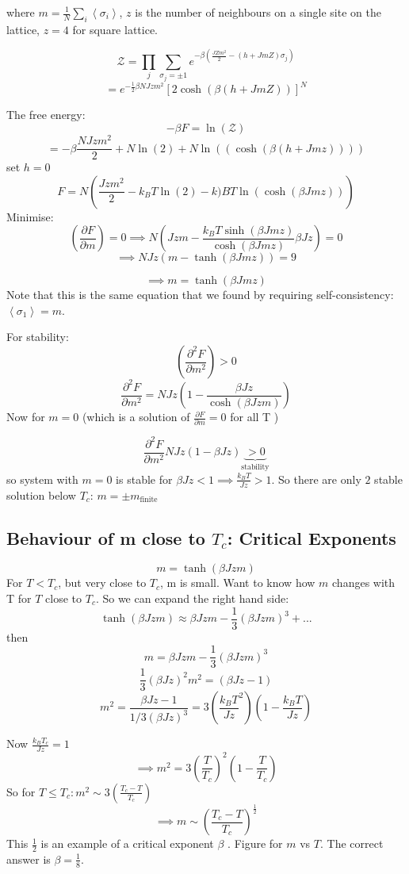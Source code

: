 \documentclass[11pt]{book}
\theoremstyle{definition}
\begin{document}
where $ m = \frac{1}{N}\sum_i \left \langle \sigma_i \right \rangle  $, $ z $ is the number of neighbours on a single site on the lattice, $ z=4 $ for square lattice.

\[ \mathcal{Z} = \prod_j \sum_{\sigma_j = \pm 1} e^{-\beta \left( \frac{JZm^2}{2}-\left( h+JmZ \right) \sigma_j \right) } \] 
\[ = e^{- \frac{1}{2} \beta NJzm^2} [2\cosh(\beta(h+JmZ))]^{N} \] 

The free energy:
\[ -\beta F = \ln(\mathcal{Z})  \] 
\[ = -\beta \frac{NJzm^2}{2}+N\ln(2) +N\ln((\cosh(\beta(h+Jmz))))  \] 
set $ h=0 $ 
\[ F = N\left( \frac{Jzm^2}{2} - k_BT \ln(2)-k)BT \ln(\cosh(\beta Jmz ))   \right)  \] 
Minimise:
\[ \left( \frac{\partial F}{\partial m} \right) = 0 \implies N \left( Jzm - \frac{k_BT\sinh(\beta Jmz)}{\cosh(\beta Jmz)} \beta Jz \right) = 0 \] 
\[ \implies NJz \left( m - \tanh(\beta Jmz) \right) = 9  \] 
\begin{shaded*}

\[ \implies m = \tanh(\beta Jmz) \] 
Note that this is the same equation that we found by requiring self-consistency: $ \left \langle \sigma_1 \right \rangle = m $.

\end{shaded*}
For stability:
\[ \left( \frac{\partial ^2F}{\partial m^2} \right) > 0 \] 
\[ \frac{\partial ^2F}{\partial m^2} = NJz \left( 1 - \frac{\beta Jz}{\cosh(\beta Jzm)} \right)   \] 
Now for $ m=0 $ (which is a solution of $ \frac{\partial F}{\partial m} =0 $ for all T )

\[ \frac{\partial ^2F}{\partial m^2} NJz(1-\beta Jz) \underbrace{> 0}_{\text{stability}}  \]  
so system with $ m=0 $ is stable for $ \beta Jz <1 \implies \frac{k_BT}{Jz} > 1 $. 
So there are only $ 2 $ stable solution below $ T_c $: $ m = \pm m_{\text{finite}} $ 

\subsection{Behaviour of m close to $ T_c $: Critical Exponents}

\[ m = \tanh(\beta Jzm) \] 
For $ T < T_c $, but very close to $ T_c $, m is small. 
Want to know how $ m $ changes with T for $ T $ close to $ T_c $.
So we can expand the right hand side:
\[ \tanh(\beta Jzm) \approx \beta Jzm - \frac{1}{3} (\beta Jzm)^3 + ...\] 
then
\[ m = \beta Jzm - \frac{1}{3} (\beta Jzm)^3\] 
\[ \frac{1}{3}(\beta Jz)^2 m^2 = (\beta Jz -1) \] 
\[ m^2 = \frac{\beta Jz -1}{1/3 (\beta Jz)^3} = 3\left( \frac{k_BT}{Jz}^2 \right) \left(1-\frac{k_BT}{Jz} \right) \] 

Now $ \frac{k_BT_c}{Jz} = 1 $ 
\[ \implies m^2 = 3\left( \frac{T}{T_c} \right)^2 \left( 1-\frac{T}{T_c} \right)  \] 
So for $ T \leq T_c: m^2 \sim 3\left( \frac{T_c-T}{T_c} \right) $  
\[ \implies m \sim \left(\frac{T_c-T}{T_c}\right)^{ \frac{1}{2} } \] 
This $ \frac{1}{2} $ is an example of a critical exponent $ \beta $ .
Figure for $m$ vs $T$.
The correct answer is $ \beta = \frac{1}{8} $.
\end{document}
